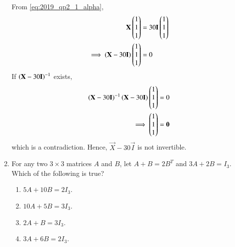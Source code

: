 \begin{enumerate}[label=\arabic*.,ref=\thesubsection.\theenumi]
\\
\solution From \eqref{eq:2019_qp2_1_alpha},
\begin{align}
\mathbf{X}\begin{pmatrix}1 \\1 \\1\end{pmatrix} &=30\mathbf{I}\begin{pmatrix}1 \\1 \\1\end{pmatrix} 
\nonumber \\
\implies \left(\mathbf{X}-30\mathbf{I}\right)\begin{pmatrix}1 \\1 \\1\end{pmatrix}  &=0
\end{align}
If $\left(\mathbf{X}-30\mathbf{I}\right)^{-1}$ exists,
\begin{align}
\left(\mathbf{X}-30\mathbf{I}\right)^{-1}\left(\mathbf{X}-30\mathbf{I}\right)\begin{pmatrix}1 \\1 \\1\end{pmatrix}  &=0
\nonumber \\
\implies \begin{pmatrix}1 \\1 \\1\end{pmatrix}  &=\mathbf{0}
\end{align}
%
which is a contradiction.  Hence, $\vec{X}-30\vec{I}$ is not invertible.
%
\item For any two $3 \times 3$ matrices $A$ and $B$, let $A+B = 2B^T$ and $3A+2B=I_3$.  Which of the following 
is true?
\begin{enumerate}
\item $5A+10B=2I_3$.
\item $10A+5B=3I_3$.
\item $2A+B=3I_3$.
\item $3A+6B=2I_3$.
\end{enumerate}
\end{enumerate}
